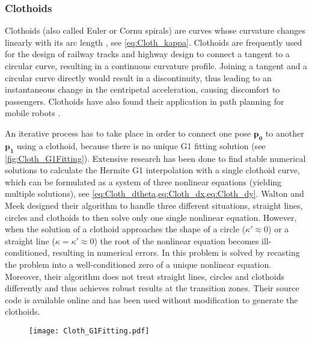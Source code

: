 \newpage
\subsubsection{Clothoids}
Clothoids (also called Euler or Cornu spirals) are curves whose curvature changes linearly with its arc length \cite{Makino1988}, see \cref{eq:Cloth_kappa}. Clothoids are frequently used for the design of railway tracks \cite{Cope1993} and highway design \cite{Baass1982} to connect a tangent to a circular curve, resulting in a continuous curvature profile. Joining a tangent and a circular curve directly would result in a discontinuity, thus leading to an instantaneous change in the centripetal acceleration, causing discomfort to passengers. Clothoids have also found their application in path planning for mobile robots \cite{FleuryEtAl1995,ScheuerFraichard1997,KellyNagy2003,BrezakPetrovic2011}.

An iterative process has to take place in order to connect one pose $\bm{p_0}$ to another $\bm{p_1}$ using a clothoid, because there is no unique G1 fitting solution (see \cref{fig:Cloth_G1Fitting}). Extensive research has been done to find stable numerical solutions to calculate the Hermite G1 interpolation with a single clothoid curve, which can be formulated as a system of three nonlinear equations (yielding multiple solutions), see \cref{eq:Cloth_dtheta,eq:Cloth_dx,eq:Cloth_dy}. Walton and Meek \cite{WaltonMeek2009} designed their algorithm to handle three different situations, straight lines, circles and clothoids to then solve only one single nonlinear equation. However, when the solution of a clothoid approaches the shape of a circle ($\kappa'\approx0$) or a straight line ($\kappa = \kappa' \approx 0$) the root of the nonlinear equation becomes ill-conditioned, resulting in numerical errors. In \cite{BertolazziFrego2015} this problem is solved by recasting the problem into a well-conditioned zero of a unique nonlinear equation. Moreover, their algorithm does not treat straight lines, circles and clothoids differently and thus achieves robust results at the transition zones. Their source code is available online \cite{BertolazziFrego2016} and has been used without modification to generate the clothoids.

\begin{figure}[!htbp]
\centering
\texttt{[image: Cloth\_G1Fitting.pdf]}
\end{figure}

